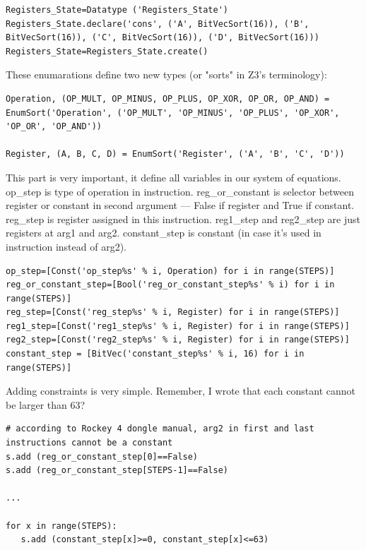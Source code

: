 \begin{lstlisting}
Registers_State=Datatype ('Registers_State')
Registers_State.declare('cons', ('A', BitVecSort(16)), ('B', BitVecSort(16)), ('C', BitVecSort(16)), ('D', BitVecSort(16)))
Registers_State=Registers_State.create()
\end{lstlisting}

These enumarations define two new types (or "sorts" in Z3's terminology):

\begin{lstlisting}
Operation, (OP_MULT, OP_MINUS, OP_PLUS, OP_XOR, OP_OR, OP_AND) = EnumSort('Operation', ('OP_MULT', 'OP_MINUS', 'OP_PLUS', 'OP_XOR', 'OP_OR', 'OP_AND'))

Register, (A, B, C, D) = EnumSort('Register', ('A', 'B', 'C', 'D'))
\end{lstlisting}

This part is very important, it define all variables in our system of equations. 
op\_step is type of operation in instruction. reg\_or\_constant is selector between register or constant in second 
argument --- False if register and True if constant. 
reg\_step is register assigned in this instruction. 
reg1\_step and reg2\_step are just registers at arg1 and arg2. 
constant\_step is constant (in case it's used in instruction instead of arg2).

\begin{lstlisting}
op_step=[Const('op_step%s' % i, Operation) for i in range(STEPS)]
reg_or_constant_step=[Bool('reg_or_constant_step%s' % i) for i in range(STEPS)]
reg_step=[Const('reg_step%s' % i, Register) for i in range(STEPS)]
reg1_step=[Const('reg1_step%s' % i, Register) for i in range(STEPS)]
reg2_step=[Const('reg2_step%s' % i, Register) for i in range(STEPS)]
constant_step = [BitVec('constant_step%s' % i, 16) for i in range(STEPS)]
\end{lstlisting}

Adding constraints is very simple. Remember, I wrote that each constant cannot be larger than 63?

\begin{lstlisting}
# according to Rockey 4 dongle manual, arg2 in first and last instructions cannot be a constant
s.add (reg_or_constant_step[0]==False)
s.add (reg_or_constant_step[STEPS-1]==False)

...

for x in range(STEPS):
   s.add (constant_step[x]>=0, constant_step[x]<=63)
\end{lstlisting}


